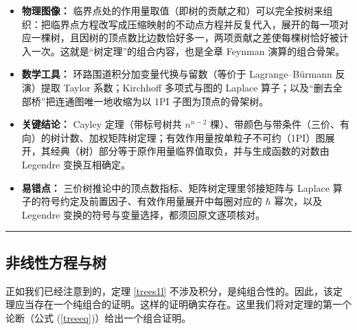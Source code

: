 
\begin{keytakeaways}
\begin{itemize}
  \item \textbf{物理图像：} 临界点处的作用量取值（即树的贡献之和）可以完全按树来组织：把临界点方程改写成压缩映射的不动点方程并反复代入，展开的每一项对应一棵树，且因树的顶点数比边数恰好多一，两项贡献之差使每棵树恰好被计入一次。这就是“树定理”的组合内容，也是全章 Feynman 演算的组合骨架。
  \item \textbf{数学工具：} 环路围道积分加变量代换与留数（等价于 Lagrange--B\"urmann 反演）提取 Taylor 系数；Kirchhoff 多项式与图的 Laplace 算子；以及“删去全部桥”把连通图唯一地收缩为以 1PI 子图为顶点的骨架树。
  \item \textbf{关键结论：} Cayley 定理（带标号树共 $n^{n-2}$ 棵）、带颜色与带条件（三价、有向）的树计数、加权矩阵树定理；有效作用量按单粒子不可约（1PI）图展开，其经典（树）部分等于原作用量临界值取负，并与生成函数的对数由 Legendre 变换互相确定。
  \item \textbf{易错点：} 三价树推论中的顶点数指标、矩阵树定理里邻接矩阵与 Laplace 算子的符号约定及前置因子、有效作用量展开中每圈对应的 $\hbar$ 幂次，以及 Legendre 变换的符号与变量选择，都须回原文逐项核对。
\end{itemize}
\end{keytakeaways}

\bigskip
\noindent\rule{\textwidth}{0.6pt}
\bigskip

\subsection{非线性方程与树}\label{treepar}

正如我们已经注意到的，定理 \ref{trees1l} 不涉及积分，是纯组合性的。因此，该定理应当存在一个纯组合的证明。这样的证明确实存在。这里我们将对定理的第一个论断（公式 (\ref{treeeq})）给出一个组合证明。

